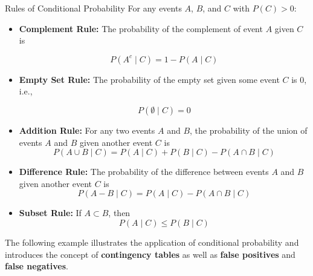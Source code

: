 \begin{theorem}{Rules of Conditional Probability}
    For any events \(A\), \(B\), and \(C\) with \(P(C)>0\):
    \begin{itemize}
        \item \textbf{Complement Rule:} The probability of the complement of event $A$ given $C$ is

        \[
        P\left(A^c \mid C\right)=1-P(A \mid C)
        \]

        \item \textbf{Empty Set Rule:} The probability of the empty set given some event $C$ is 0, i.e.,

        \[P(\emptyset \mid C) = 0\]

        \item \textbf{Addition Rule:} For any two events $A$ and $B$, the probability of the union of events $A$ and $B$ given another event $C$ is
        \[
        P(A \cup B \mid C)=P(A \mid C)+P(B \mid C)-P(A \cap B \mid C)
        \]

        \item \textbf{Difference Rule:} The probability of the difference between events $A$ and $B$ given another event $C$ is
        \[
            P(A-B \mid C)=P(A \mid C)-P(A \cap B \mid C)
        \]
        \item \textbf{Subset Rule:} If $A \subset B$, then
        \[
        P(A \mid C) \leq P(B \mid C)
        \]
    \end{itemize}
\end{theorem}

The following example illustrates the application of conditional probability and introduces the concept of \textbf{contingency tables} as well as \textbf{false positives} and \textbf{false negatives}.

